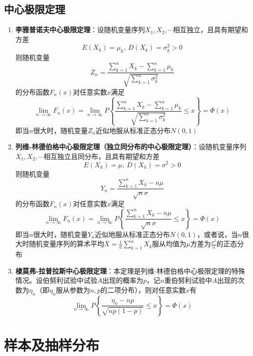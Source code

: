 \documentclass[12pt,a4paper,UTF8]{book}
\begin{document}
\subsection{中心极限定理}
\begin{enumerate}
\item \textbf{李雅普诺夫中心极限定理}：设随机变量序列$X_1,X_2,\cdots$相互独立，且具有期望和方差
\[E\left(X_k\right)=\mu_k,\ D\left(X_k\right)=\sigma_k^2>0\]
则随机变量
\[Z_n=\frac{\sum\limits_{k=1}^{n}X_k-\sum\limits_{k=1}^{n}\mu_k}{\sqrt{\sum\limits_{k=1}^{n}\sigma_k^2}}\]
的分布函数$F_n\left(x\right)$对任意实数$x$满足
\[\lim\limits_{n\to\infty}F_n\left(x\right)=\lim\limits_{n\to\infty}P\left\{\frac{\sum\limits_{k=1}^{n}X_k-\sum\limits_{k=1}^{n}\mu_k}{\sqrt{\sum\limits_{k=1}^{n}\sigma_k^2}}\leq x\right\}=\varPhi\left(x\right)\]
即当$n$很大时，随机变量$Z_n$近似地服从标准正态分布$N\left(0,1\right)$
\item \textbf{列维-林德伯格中心极限定理（独立同分布的中心极限定理）}：设随机变量序列$X_1,X_2,\cdots$相互独立且同分布，且具有期望和方差
\[E\left(X_k\right)=\mu,\ D\left(X_k\right)=\sigma^2>0\]
则随机变量
\[Y_n=\frac{\sum\limits_{k=1}^{n}X_k-n\mu}{\sqrt{n}\sigma}\]
的分布函数$F_n\left(x\right)$对任意实数$x$满足
\[\lim\limits_{n\to\infty}F_n\left(x\right)=\lim\limits_{n\to\infty}P\left\{\frac{\sum\limits_{k=1}^{n}X_k-n\mu}{\sqrt{n}\sigma}\leq x\right\}=\varPhi\left(x\right)\]
即当$n$很大时，随机变量$Y_n$近似地服从标准正态分布$N\left(0,1\right)$，或者说，当$n$很大时随机变量序列的算术平均$\overline{X}=\frac{1}{n}\sum\limits_{k=1}^{n}X_k$服从均值为$\mu$方差为$\frac{\sigma^2}{n}$的正态分布
\item \textbf{棣莫弗-拉普拉斯中心极限定理}：本定理是列维-林德伯格中心极限定理的特殊情况。设伯努利试验中试验$A$出现的概率为$p$，记$n$重伯努利试验中$A$出现的次数为$\eta_n$（即$\eta_n$服从参数为$n,p$的二项分布），则对任意实数$x$有
\[\lim\limits_{n\to\infty}P\left\{\frac{\eta_n-np}{\sqrt{np\left(1-p\right)}}\leq x\right\}=\varPhi\left(x\right)\]
\end{enumerate}


\section{样本及抽样分布}
\end{document}
